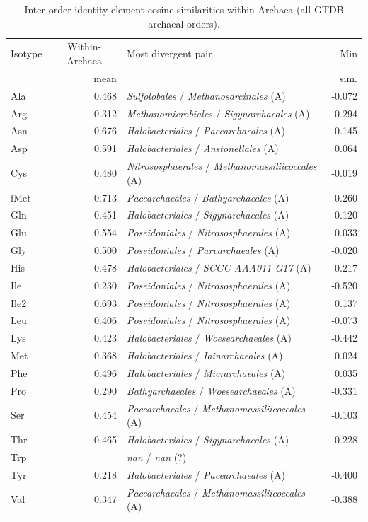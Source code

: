 \begin{table}[!ht]
\centering
\small
\caption{Inter-order identity element cosine similarities within Archaea (all GTDB archaeal orders).}
\label{tab:order_identity_archaea}
\begin{tabular}{lrlr}
\toprule
Isotype & \multicolumn{1}{c}{Within-Archaea} & Most divergent pair & Min \\
 & mean & & sim. \\
\midrule
  Ala & 0.468 & \textit{Sulfolobales} / \textit{Methanosarcinales} (A) & -0.072 \\
  Arg & 0.312 & \textit{Methanomicrobiales} / \textit{Sigynarchaeales} (A) & -0.294 \\
  Asn & 0.676 & \textit{Halobacteriales} / \textit{Pacearchaeales} (A) & 0.145 \\
  Asp & 0.591 & \textit{Halobacteriales} / \textit{Anstonellales} (A) & 0.064 \\
  Cys & 0.480 & \textit{Nitrososphaerales} / \textit{Methanomassiliicoccales} (A) & -0.019 \\
  fMet & 0.713 & \textit{Pacearchaeales} / \textit{Bathyarchaeales} (A) & 0.260 \\
  Gln & 0.451 & \textit{Halobacteriales} / \textit{Sigynarchaeales} (A) & -0.120 \\
  Glu & 0.554 & \textit{Poseidoniales} / \textit{Nitrososphaerales} (A) & 0.033 \\
  Gly & 0.500 & \textit{Poseidoniales} / \textit{Parvarchaeales} (A) & -0.020 \\
  His & 0.478 & \textit{Halobacteriales} / \textit{SCGC-AAA011-G17} (A) & -0.217 \\
  Ile & 0.230 & \textit{Poseidoniales} / \textit{Nitrososphaerales} (A) & -0.520 \\
  Ile2 & 0.693 & \textit{Poseidoniales} / \textit{Nitrososphaerales} (A) & 0.137 \\
  Leu & 0.406 & \textit{Poseidoniales} / \textit{Nitrososphaerales} (A) & -0.073 \\
  Lys & 0.423 & \textit{Halobacteriales} / \textit{Woesearchaeales} (A) & -0.442 \\
  Met & 0.368 & \textit{Halobacteriales} / \textit{Iainarchaeales} (A) & 0.024 \\
  Phe & 0.496 & \textit{Halobacteriales} / \textit{Micrarchaeales} (A) & 0.035 \\
  Pro & 0.290 & \textit{Bathyarchaeales} / \textit{Woesearchaeales} (A) & -0.331 \\
  Ser & 0.454 & \textit{Pacearchaeales} / \textit{Methanomassiliicoccales} (A) & -0.103 \\
  Thr & 0.465 & \textit{Halobacteriales} / \textit{Sigynarchaeales} (A) & -0.228 \\
  Trp & \text{---} & \textit{nan} / \textit{nan} (?) & \text{---} \\
  Tyr & 0.218 & \textit{Halobacteriales} / \textit{Pacearchaeales} (A) & -0.400 \\
  Val & 0.347 & \textit{Pacearchaeales} / \textit{Methanomassiliicoccales} (A) & -0.388 \\
\bottomrule
\end{tabular}
\end{table}

